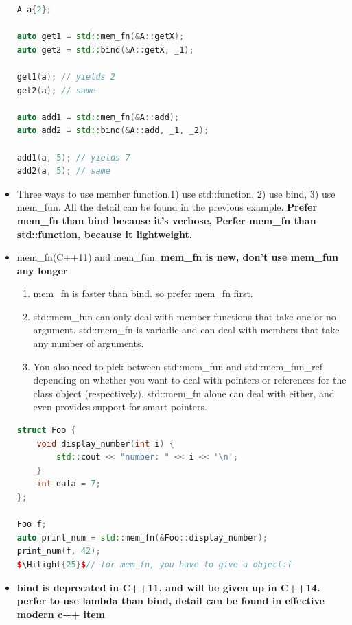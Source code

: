 \documentclass[a4paper,12pt,twoside]{book}
\newcommand{\Hilight}[1]{\makebox[0pt][l]{\color{yellow}\rule[-3pt]{#1em}{11pt}}}
\begin{document}
\begin{itemize}
\begin{lstlisting}[frame=single, language=c++]
A a{2};

auto get1 = std::mem_fn(&A::getX);
auto get2 = std::bind(&A::getX, _1);

get1(a); // yields 2
get2(a); // same

auto add1 = std::mem_fn(&A::add);
auto add2 = std::bind(&A::add, _1, _2);

add1(a, 5); // yields 7
add2(a, 5); // same
\end{lstlisting}
\item Three ways to use member function.1) use std::function, 2) use bind, 3) use mem\_fun. All the detail can be found in the previous example. \textbf{Prefer mem\_fn than bind because it's verbose, Perfer mem\_fn  than std::function, because it lightweight.}


\item mem\_fn(C++11) and mem\_fun. \textbf{mem\_fn is new, don't use mem\_fun any longer}
\begin{enumerate}
\item mem\_fn is faster than bind.  so prefer mem\_fn first.

\item std::mem\_fun can only deal with member functions that take one or no argument. std::mem\_fn is variadic and can deal with members that take any number of arguments.

\item You also need to pick between std::mem\_fun and std::mem\_fun\_ref depending on whether you want to deal with pointers or references for the class object (respectively). std::mem\_fn alone can deal with either, and even provides support for smart pointers.
\end{enumerate}

\begin{lstlisting}[frame=single, language=c++, mathescape=true]
struct Foo {
    void display_number(int i) {
        std::cout << "number: " << i << '\n';
    }
    int data = 7;
};

Foo f;
auto print_num = std::mem_fn(&Foo::display_number);
print_num(f, 42); 
$\Hilight{25}$// for mem_fn, you have to give a object:f
\end{lstlisting}

\item \textbf{bind is deprecated in C++11, and will be given up in C++14. perfer to use lambda than bind, detail can be found in effective modern c++ item }

\end{itemize}
\end{document}
